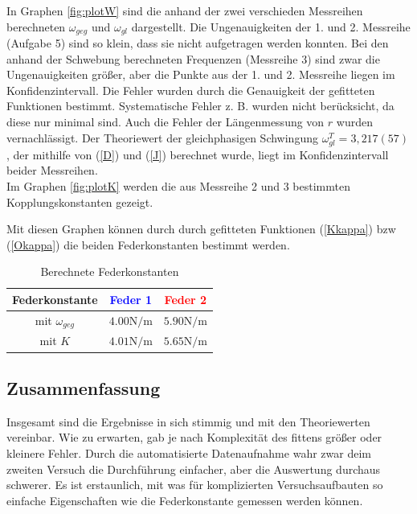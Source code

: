 \documentclass[11pt, a4paper]{article}
\begin{document}
    In Graphen \ref{fig:plotW} sind die anhand der zwei verschieden Messreihen
    berechneten $\omega_{geg}$ und $\omega_{gl}$ dargestellt. Die Ungenauigkeiten der 1. und 2. Messreihe (Aufgabe 5) sind so klein,
    dass sie nicht aufgetragen werden konnten. Bei den anhand der Schwebung berechneten Frequenzen (Messreihe 3)
    sind zwar die Ungenauigkeiten größer, aber die Punkte aus der 1. und 2. Messreihe liegen im Konfidenzintervall.
    Die Fehler wurden durch die Genauigkeit der gefitteten Funktionen bestimmt. Systematische Fehler z. B. wurden
    nicht berücksicht, da diese nur minimal sind. Auch die Fehler der Längenmessung von $r$ wurden vernachlässigt.
    Der Theoriewert der gleichphasigen Schwingung $\omega_{gl}^T = 3,217(57)$,
    der mithilfe von (\ref{D}) und (\ref{J}) berechnet wurde,
    liegt im Konfidenzintervall beider Messreihen. \\
    
    Im Graphen \ref{fig:plotK} werden die aus Messreihe 2 und 3 bestimmten Kopplungskonstanten gezeigt.

    Mit diesen Graphen können durch durch gefitteten Funktionen (\ref{Kkappa}) bzw (\ref{Okappa}) die beiden
    Federkonstanten bestimmt werden.
    \begin{table}[H]
        \centering
        \begin{tabular}{c c c}
            Federkonstante & \textcolor{blue}{Feder 1} & \textcolor{red}{Feder 2} \\ \hline
            mit $\omega_{geg}$ & $4.00 \si{\newton\per\metre}$ & $5.90\si{\newton\per\metre}$\\
            mit $K$ & $4.01 \si{\newton\per\metre}$ & $5.65\si{\newton\per\metre}$\\
            
        \end{tabular}
        \caption{Berechnete Federkonstanten}
    \end{table}


    \subsection{Zusammenfassung}
    Insgesamt sind die Ergebnisse in sich stimmig und mit den Theoriewerten vereinbar. Wie zu erwarten, gab
    je nach Komplexität des fittens größer oder kleinere Fehler. Durch die automatisierte Datenaufnahme
    wahr zwar deim zweiten Versuch die Durchführung einfacher, aber die Auswertung durchaus schwerer.
    Es ist erstaunlich, mit was für komplizierten
    Versuchsaufbauten so einfache Eigenschaften wie die Federkonstante gemessen werden können.
\end{document}
